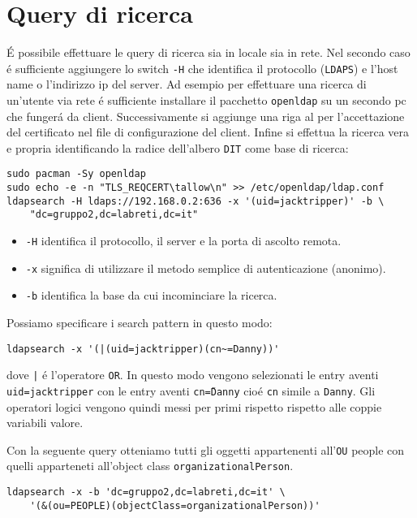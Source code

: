 \documentclass[11pt, a4paper, oneside]{article}
\begin{document}
	\part{Query di ricerca}
			\par
				\'E possibile effettuare le query di ricerca
				sia in locale sia in rete. Nel secondo caso \'e 
				sufficiente aggiungere lo switch \texttt{-H}
				che identifica il protocollo (\texttt{LDAPS}) e 
				l'host name o l'indirizzo ip del server.
				Ad esempio per effettuare una ricerca di 
				un'utente via rete \'e sufficiente installare 
				il pacchetto \texttt{openldap} su un secondo pc 
				che funger\'a da client. Successivamente si 
				aggiunge una riga al per l'accettazione del 
				certificato nel file di configurazione del 
				client. Infine si effettua la ricerca vera e 
				propria identificando la radice dell'albero 
				\texttt{DIT} come base di ricerca:
				\begin{verbatim}
sudo pacman -Sy openldap
sudo echo -e -n "TLS_REQCERT\tallow\n" >> /etc/openldap/ldap.conf
ldapsearch -H ldaps://192.168.0.2:636 -x '(uid=jacktripper)' -b \
	"dc=gruppo2,dc=labreti,dc=it"
				\end{verbatim}
				\begin{itemize}
					\item
						\texttt{-H} identifica il
						protocollo,  il server e la 
						porta di ascolto remota.
					\item
						\texttt{-x} significa di 
						utilizzare il metodo semplice 
						di autenticazione (anonimo).
					\item
						\texttt{-b} identifica la base 
						da cui incominciare la 
						ricerca.
				\end{itemize}
			\par
				Possiamo specificare i search pattern in questo 
				modo:
				\begin{verbatim}
ldapsearch -x '(|(uid=jacktripper)(cn~=Danny))'
				\end{verbatim}
				dove 
				\texttt{|} \'e l'operatore \texttt{OR}. In 
				questo modo vengono selezionati le entry aventi 
				\texttt{uid=jacktripper} con le entry aventi 
				\texttt{cn\~=Danny} cio\'e \texttt{cn} simile a 
				\texttt{Danny}. Gli operatori logici vengono 
				quindi messi per primi rispetto rispetto alle 
				coppie variabili valore.
			\par
				Con la seguente query otteniamo tutti gli 
				oggetti appartenenti all'\texttt{OU} people con 
				quelli apparteneti all'object class 
				\texttt{organizationalPerson}.
				\begin{verbatim}
ldapsearch -x -b 'dc=gruppo2,dc=labreti,dc=it' \
	'(&(ou=PEOPLE)(objectClass=organizationalPerson))'
				\end{verbatim}				
			\newpage
\end{document}
